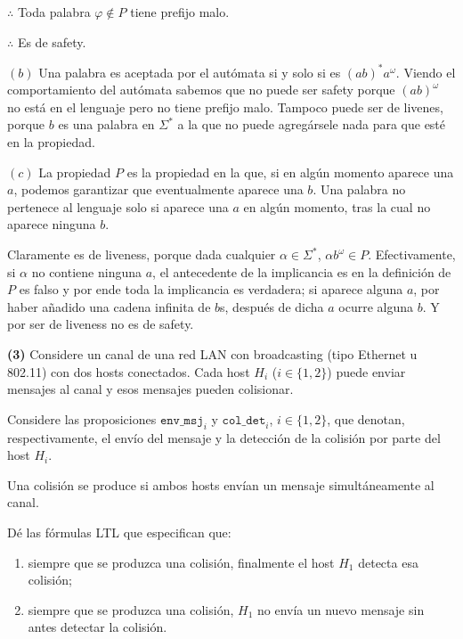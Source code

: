 \documentclass[a4paper, 12pt]{article}
\begin{document}
$\therefore $ Toda palabra $\varphi \not\in P$ tiene prefijo malo. 

$\therefore $ Es de safety.

$(b)$ Una palabra es aceptada por el autómata si y solo si es $(ab)^* a^\omega$.
Viendo el comportamiento del autómata sabemos que no puede ser safety porque
$(ab)^\omega$ no está en el lenguaje pero no tiene prefijo malo. Tampoco puede
ser de livenes, porque $b$ es una palabra en $\Sigma^*$ a la que no puede
agregársele nada para que esté en la propiedad.

$(c)$ La propiedad $P$ es la propiedad en la que, si en algún momento aparece
una $a$, podemos garantizar que eventualmente aparece una $b$. Una palabra no
pertenece al lenguaje solo si aparece una $a$ en algún momento, tras la cual no
aparece ninguna $b$. 

Claramente es de liveness, porque dada cualquier $\alpha \in \Sigma^*$, $\alpha
b^\omega \in P$. Efectivamente, si $\alpha$ no contiene ninguna $a$, el
antecedente de la implicancia es en la definición de $P$ es falso y por ende
toda la implicancia es verdadera; si aparece alguna $a$, por haber añadido una
cadena infinita de $b$s, después de dicha $a$ ocurre alguna $b$. Y por ser de
liveness no es de safety.

\pagebreak 

\begin{myframe}
    \textbf{(3)} Considere un canal de una red LAN con broadcasting (tipo Ethernet u 802.11)
con dos hosts conectados. Cada host $H_i$ ($i \in \{1,2\}$) puede enviar
mensajes al canal y esos mensajes pueden colisionar.

Considere las proposiciones $\texttt{env\_msj}_i$ y $\texttt{col\_det}_i$,
$i \in \{1,2\}$, que denotan, respectivamente, el envío del mensaje y la
detección de la colisión por parte del host $H_i$.

Una colisión se produce si ambos hosts envían un mensaje simultáneamente al
canal.

Dé las fórmulas LTL que especifican que:

\begin{enumerate}
    \item[(a)] siempre que se produzca una colisión, finalmente el host
    $H_1$ detecta esa colisión;

    \item[(b)] siempre que se produzca una colisión, $H_1$ no envía un nuevo
    mensaje sin antes detectar la colisión.
\end{enumerate}
\end{myframe}
\end{document}
